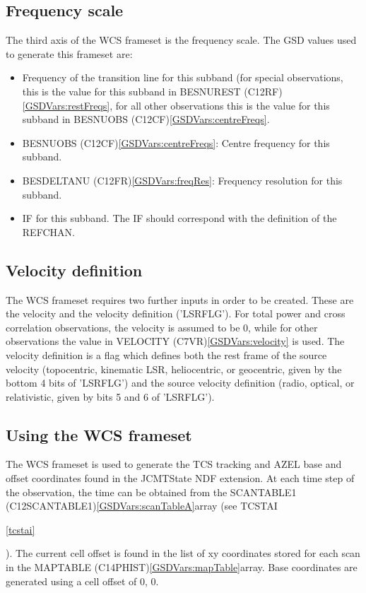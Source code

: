 \documentclass[twoside,11pt]{article}
\newcommand{\xlabel}[1]{}
\renewcommand{\_}{\texttt{\symbol{95}}}
\newcommand{\velocity}{VELOCITY (C7VR)}
\newcommand{\scanTableA}{SCAN\_TABLE1 (C12SCAN\_TABLE\_1)}
\newcommand{\mapTable}{MAP\_TABLE (C14PHIST)}
\newcommand{\centreFreqs}{BES\_NUOBS (C12CF)}
\newcommand{\restFreqs}{BES\_NUREST (C12RF)}
\newcommand{\freqRes}{BES\_DELTANU (C12FR)}
\renewcommand{\velocity}{VELOCITY (C7VR)\ref{GSDVars:velocity}}
\renewcommand{\scanTableA}{SCAN\_TABLE1 (C12SCAN\_TABLE\_1)\ref{GSDVars:scanTableA}}
\renewcommand{\mapTable}{MAP\_TABLE (C14PHIST)\ref{GSDVars:mapTable}}
\renewcommand{\centreFreqs}{BES\_NUOBS (C12CF)\ref{GSDVars:centreFreqs}}
\renewcommand{\restFreqs}{BES\_NUREST (C12RF)\ref{GSDVars:restFreqs}}
\renewcommand{\freqRes}{BES\_DELTANU (C12FR)\ref{GSDVars:freqRes}}
\begin{document}
\subsection{\xlabel{WCS_FREQUENCY}Frequency scale}

The third axis of the WCS frameset is the frequency scale.  The GSD values used to generate this frameset are:

\begin{itemize}
\item Frequency of the transition line for this subband (for special observations, this is the value for this subband in \restFreqs{}, for all other observations this is the value for this subband in \centreFreqs{}.
\item \centreFreqs{}: Centre frequency for this subband.
\item \freqRes{}: Frequency resolution for this subband.
\item IF for this subband.  The IF should correspond with the definition of the REFCHAN.
\end{itemize}

\subsection{\xlabel{WCS_VELOCITY}Velocity definition}

The WCS frameset requires two further inputs in order to be created.  These are the velocity and the velocity definition ('LSRFLG').  For total power and cross correlation observations, the velocity is assumed to be 0, while for other observations the value in \velocity{} is used.  The velocity definition is a flag which defines both the rest frame of the source velocity (topocentric, kinematic LSR, heliocentric, or geocentric, given by the bottom 4 bits of 'LSRFLG') and the source velocity definition (radio, optical, or relativistic, given by bits 5 and 6 of 'LSRFLG').

\subsection{\xlabel{WCS_USING}Using the WCS frameset}

The WCS frameset is used to generate the TCS tracking and AZEL base and offset coordinates found in the JCMTState NDF extension.  
At each time step of the observation, the time can be obtained from the \scanTableA array (see TCS\_TAI
\begin{htmlonly}
\ref{tcstai}
\end{htmlonly}
).  The current cell offset is found in the list of xy coordinates stored for each scan in the \mapTable array.  Base coordinates are generated using a cell offset of 0, 0.
\end{document}
